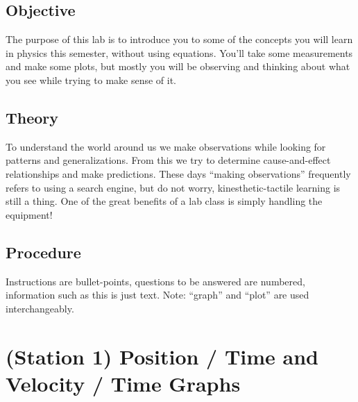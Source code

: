     \subsection*{Objective}

    The purpose of this lab is to introduce you to some of the concepts you will learn in physics this semester, without using equations. You’ll take some measurements and make some plots, but mostly you will be observing and thinking about what you see while trying to make sense of it. 

    \subsection*{Theory}

    To understand the world around us we make observations while looking for patterns and generalizations. From this we try to determine cause-and-effect relationships and make predictions. These days “making observations” frequently refers to using a search engine, but do not worry, kinesthetic-tactile learning is still a thing. One of the great benefits of a lab class is simply handling the equipment! 


    \subsection*{Procedure} 
    
    Instructions are bullet-points, questions to be answered are numbered, information such as this is just text. Note: “graph” and “plot” are used interchangeably.

    \pagebreak

    \section*{(Station 1) Position / Time and Velocity / Time Graphs}

